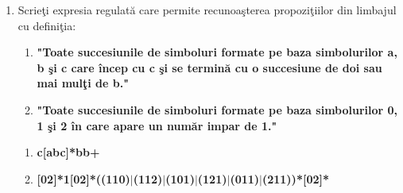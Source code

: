 \begin{enumerate}
\item
Scrieţi expresia regulată care permite recunoaşterea propoziţiilor din limbajul cu definiţia:
\begin{enumerate}
\item \textbf{"Toate succesiunile de simboluri formate pe baza simbolurilor a, b şi c care încep cu c şi se termină cu o succesiune de doi sau mai mulţi de b."}
\item \textbf{"Toate succesiunile de simboluri formate pe baza simbolurilor 0, 1 şi 2 în care apare un număr impar de 1."}
\end{enumerate}

\begin{enumerate}
\item \textbf{c[abc]*bb+}
\item \textbf{[02]*1[02]*((110)$|$(112)$|$(101)$|$(121)$|$(011)$|$(211))*[02]*}
\end{enumerate}

\end{enumerate}